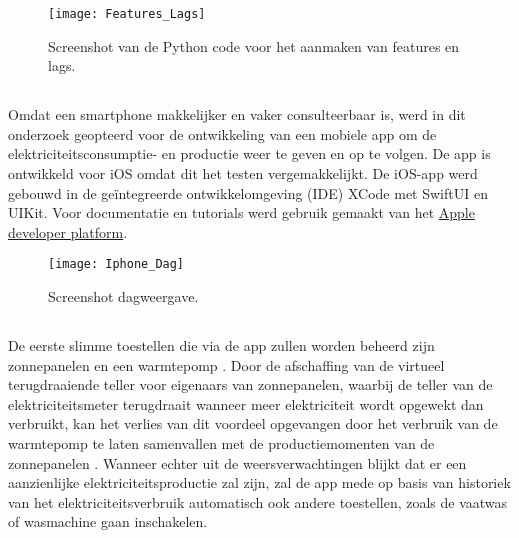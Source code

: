 \begin{figure}[h!]
    \centering\texttt{[image: Features\_Lags]}
    \caption{\label{fig:Features_Lags}Screenshot van de Python code voor het aanmaken van features en lags.}
\end{figure} 

\subsection{}%
\label{sec:Weergave uitgelezen data en voorspelling met een iOS app}

Omdat een smartphone makkelijker en vaker consulteerbaar is, werd in dit onderzoek geopteerd voor de ontwikkeling van een mobiele app om de elektriciteitsconsumptie- en productie weer te geven en op te volgen. De app is ontwikkeld voor iOS omdat dit het testen vergemakkelijkt. De iOS-app werd gebouwd in de geïntegreerde ontwikkelomgeving (IDE) XCode met SwiftUI en UIKit. Voor documentatie en tutorials werd gebruik gemaakt van het \href{https://developer.apple.com/}{Apple developer platform}. \\

\begin{figure}[h!]
    \centering\texttt{[image: Iphone\_Dag]}
    \caption{\label{fig:Iphone_Dag}Screenshot dagweergave.}
\end{figure} 


\subsection{}%
\label{sec:Aansturing slimme stekkers aansturen op basis van voorspelde stroomproductie}

De eerste slimme toestellen die via de app zullen worden beheerd zijn zonnepanelen en een warmtepomp \autocite{Uytterhoeven2019}. Door de afschaffing van de virtueel terugdraaiende teller voor eigenaars van zonnepanelen, waarbij de teller van de elektriciteitsmeter terugdraait wanneer meer elektriciteit wordt opgewekt dan verbruikt, kan het verlies van dit voordeel opgevangen door het verbruik van de warmtepomp te laten samenvallen met de productiemomenten van de zonnepanelen \autocite{Selleslagh2021}. Wanneer echter uit de weersverwachtingen blijkt dat er een aanzienlijke elektriciteitsproductie zal zijn, zal de app  mede op basis van historiek van het elektriciteitsverbruik automatisch ook andere toestellen, zoals de vaatwas of wasmachine gaan inschakelen.

